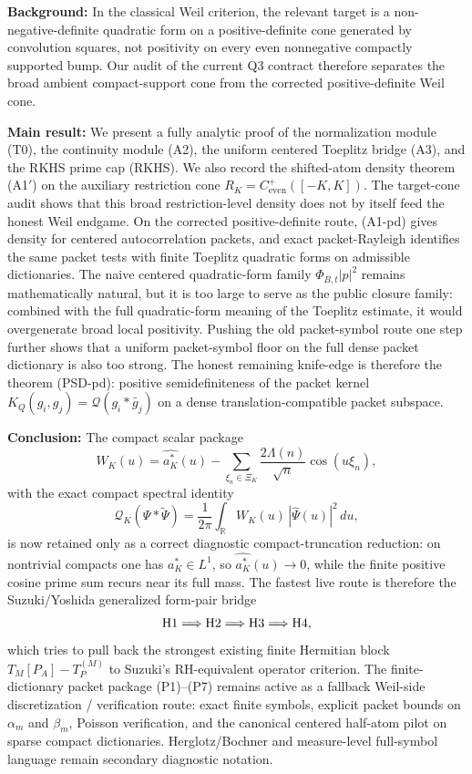\textbf{Background:} In the classical Weil criterion, the relevant target is a non-negative-definite quadratic form on a positive-definite cone generated by convolution squares, not positivity on every even nonnegative compactly supported bump. Our audit of the current Q3 contract therefore separates the broad ambient compact-support cone from the corrected positive-definite Weil cone.

\textbf{Main result:} We present a fully analytic proof of the normalization module \textup{(T0)}, the continuity module \textup{(A2)}, the uniform centered Toeplitz bridge \textup{(A3)}, and the RKHS prime cap \textup{(RKHS)}. We also record the shifted-atom density theorem \textup{(A1$'$)} on the auxiliary restriction cone $R_K=C^+_{\mathrm{even}}([-K,K])$. The target-cone audit shows that this broad restriction-level density does not by itself feed the honest Weil endgame. On the corrected positive-definite route, \textup{(A1-pd)} gives density for centered autocorrelation packets, and exact packet-Rayleigh identifies the same packet tests with finite Toeplitz quadratic forms on admissible dictionaries. The naive centered quadratic-form family $\Phi_{B,t}|p|^2$ remains mathematically natural, but it is too large to serve as the public closure family: combined with the full quadratic-form meaning of the Toeplitz estimate, it would overgenerate broad local positivity. Pushing the old packet-symbol route one step further shows that a uniform packet-symbol floor on the full dense packet dictionary is also too strong. The honest remaining knife-edge is therefore the theorem \textup{(PSD-pd)}: positive semidefiniteness of the packet kernel $K_Q(g_i,g_j)=\mathcal Q(g_i * \widetilde{g_j})$ on a dense translation-compatible packet subspace.

\textbf{Conclusion:} The compact scalar package
\[
  W_K(u)=\widehat{a_K^*}(u)-\sum_{\xi_n\in\Xi_K}\frac{2\Lambda(n)}{\sqrt n}\cos(u\xi_n),
\]
with the exact compact spectral identity
\[
  \mathcal Q_K(\Psi*\widetilde{\Psi})
  =
  \frac1{2\pi}\int_{\mathbb R}W_K(u)\,|\widehat\Psi(u)|^2\,du,
\]
is now retained only as a correct diagnostic compact-truncation reduction: on nontrivial compacts one has $a_K^*\in L^1$, so $\widehat{a_K^*}(u)\to0$, while the finite positive cosine prime sum recurs near its full mass. The fastest live route is therefore the Suzuki/Yoshida generalized form-pair bridge
\[
  \textup{H1} \Longrightarrow \textup{H2} \Longrightarrow \textup{H3} \Longrightarrow \textup{H4},
\]
which tries to pull back the strongest existing finite Hermitian block $T_M[P_A]-T_P^{(M)}$ to Suzuki's RH-equivalent operator criterion. The finite-dictionary packet package \textup{(P1)}--\textup{(P7)} remains active as a fallback Weil-side discretization / verification route: exact finite symbols, explicit packet bounds on $\alpha_m$ and $\beta_m$, Poisson verification, and the canonical centered half-atom pilot on sparse compact dictionaries. Herglotz/Bochner and measure-level full-symbol language remain secondary diagnostic notation.
